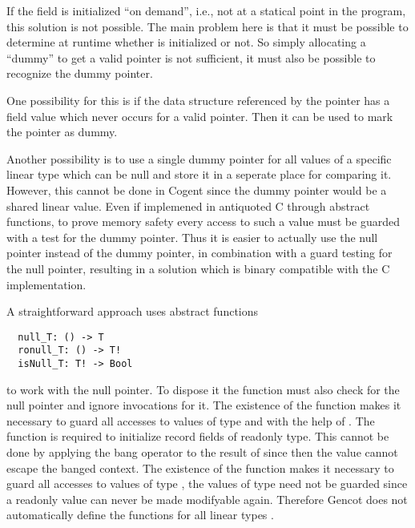 If the field  is initialized ``on demand'', i.e., not at a statical point in the program, this solution is not possible.
The main problem here is that it must be possible to determine at runtime whether  is initialized or not. So simply
allocating a ``dummy'' to get a valid pointer is not sufficient, it must also be possible to recognize the dummy pointer.

One possibility for this is if the data structure referenced by the pointer has a field value which never occurs for a valid
pointer. Then it can be used to mark the pointer as dummy.

Another possibility is to use a single dummy pointer for all values of a specific linear type which can be null and store it 
in a seperate place for comparing it. However, this cannot be done in Cogent since the dummy pointer would be a shared linear 
value. Even if implemened in antiquoted C through abstract functions, to prove memory safety every access to such a value must 
be guarded with a test for the dummy pointer. Thus it is easier to actually use the null pointer instead of the dummy pointer,
in combination with a guard testing for the null pointer, resulting in a solution which is binary compatible with the C 
implementation.

A straightforward approach uses abstract functions
\begin{verbatim}
  null_T: () -> T
  ronull_T: () -> T!
  isNull_T: T! -> Bool
\end{verbatim}
to work with the null pointer. To dispose it the function  must also check for the null pointer and ignore
invocations for it. The existence of the function  makes it necessary to guard all accesses to values of type
 and  with the help of . The function  is required to initialize record fields 
of readonly type. This cannot be done by applying the bang operator to the result of  since then the value
cannot escape the banged context. The existence of the function  makes it necessary to guard
all accesses to values of type , the values of type  need not be guarded since a readonly value can never be 
made modifyable again. Therefore Gencot does not automatically define the functions for all 
linear types .

